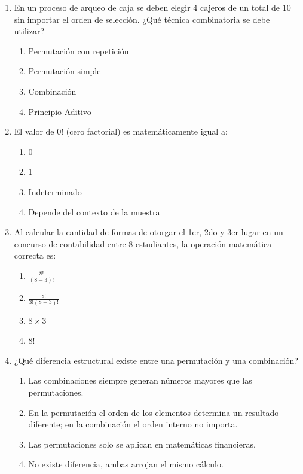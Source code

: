 \documentclass[12pt,letterpaper]{book}
\begin{document}
\begin{enumerate}[label=\textbf{Pregunta \arabic*:}]
    \item En un proceso de arqueo de caja se deben elegir 4 cajeros de un total de 10 sin importar el orden de selección. ¿Qué técnica combinatoria se debe utilizar?
    \begin{enumerate}[label=\alph*)]
        \item Permutación con repetición
        \item Permutación simple
        \item Combinación
        \item Principio Aditivo
    \end{enumerate}
    
    \item El valor de $0!$ (cero factorial) es matemáticamente igual a:
    \begin{enumerate}[label=\alph*)]
        \item 0
        \item 1
        \item Indeterminado
        \item Depende del contexto de la muestra
    \end{enumerate}
    
    \item Al calcular la cantidad de formas de otorgar el 1er, 2do y 3er lugar en un concurso de contabilidad entre 8 estudiantes, la operación matemática correcta es:
    \begin{enumerate}[label=\alph*)]
        \item $\frac{8!}{(8-3)!}$
        \item $\frac{8!}{3!(8-3)!}$
        \item $8 \times 3$
        \item $8!$
    \end{enumerate}
    
    \item ¿Qué diferencia estructural existe entre una permutación y una combinación?
    \begin{enumerate}[label=\alph*)]
        \item Las combinaciones siempre generan números mayores que las permutaciones.
        \item En la permutación el orden de los elementos determina un resultado diferente; en la combinación el orden interno no importa.
        \item Las permutaciones solo se aplican en matemáticas financieras.
        \item No existe diferencia, ambas arrojan el mismo cálculo.
    \end{enumerate}
    

\end{enumerate}
\end{document}
